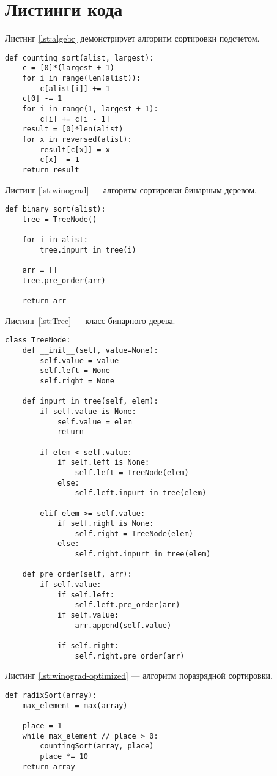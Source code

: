 \section{Листинги кода}
Листинг \ref{lst:algebr} демонстрирует алгоритм сортировки подсчетом. 


\captionsetup{singlelinecheck = false, justification=raggedright}
\begin{lstlisting}[label=lst:algebr,caption=Алгоритм сортировки подсчетомя]
def counting_sort(alist, largest):
	c = [0]*(largest + 1)
	for i in range(len(alist)):
		c[alist[i]] += 1
	c[0] -= 1
	for i in range(1, largest + 1):
		c[i] += c[i - 1]
	result = [0]*len(alist)
	for x in reversed(alist):
		result[c[x]] = x
		c[x] -= 1
	return result
\end{lstlisting}


Листинг \ref{lst:winograd} --- алгоритм сортировки бинарным деревом.

\begin{lstlisting}[label=lst:winograd,caption=Алгоритм сортировки бинарным дерево]
def binary_sort(alist):
	tree = TreeNode()
	
	for i in alist:
		tree.inpurt_in_tree(i)
	
	arr = []
	tree.pre_order(arr)
	
	return arr
\end{lstlisting}	

Листинг \ref{lst:Tree} --- класс бинарного дерева.

\begin{lstlisting}[label=lst:Tree,caption=Класс бинарного дерев]
	class TreeNode:
	def __init__(self, value=None):
		self.value = value
		self.left = None
		self.right = None
	
	def inpurt_in_tree(self, elem):
		if self.value is None:
			self.value = elem
			return
		
		if elem < self.value:
			if self.left is None:
				self.left = TreeNode(elem)
			else:
				self.left.inpurt_in_tree(elem)
			
		elif elem >= self.value:
			if self.right is None:
				self.right = TreeNode(elem)
			else:
				self.right.inpurt_in_tree(elem)
	
	def pre_order(self, arr):
		if self.value:
			if self.left:
				self.left.pre_order(arr)
			if self.value: 
				arr.append(self.value)
			
			if self.right:
				self.right.pre_order(arr)
\end{lstlisting}	

\newpage
Листинг \ref{lst:winograd-optimized} --- алгоритм поразрядной сортировки.
\begin{lstlisting}[label=lst:winograd-optimized,caption=Алгоритм поразрядной сортировки]
	def radixSort(array):
    max_element = max(array)

    place = 1
    while max_element // place > 0:
        countingSort(array, place)
        place *= 10
    return array
    
\end{lstlisting}	

